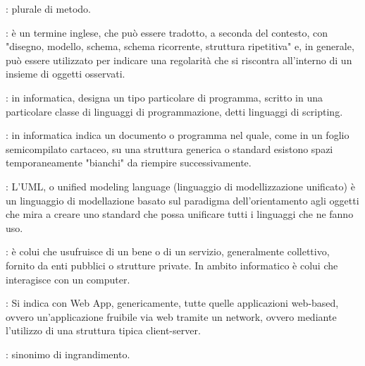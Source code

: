 {		%
		: plurale di metodo.
		

		: è un termine inglese, che può essere tradotto, a seconda del contesto, con "disegno, modello, schema, schema ricorrente, struttura ripetitiva" e, in generale, può essere utilizzato per indicare una regolarità che si riscontra all'interno di un insieme di oggetti osservati.


		: in informatica, designa un tipo particolare di programma, scritto in una particolare classe di linguaggi di programmazione, detti linguaggi di scripting.


		: in informatica indica un documento o programma nel quale, come in un foglio semicompilato cartaceo, su una struttura generica o standard esistono spazi temporaneamente "bianchi" da riempire successivamente.


		: L'UML, o unified modeling language (linguaggio di modellizzazione unificato) è un linguaggio di modellazione basato sul paradigma dell'orientamento agli oggetti
che mira a creare uno standard che possa unificare tutti i linguaggi che ne fanno uso.

		: è colui che usufruisce di un bene o di un servizio, generalmente collettivo, fornito da enti pubblici o strutture private. In ambito informatico è colui che interagisce con un computer.


		: Si indica con Web App, genericamente, tutte quelle applicazioni web-based, ovvero un'applicazione fruibile via web tramite un network, ovvero
mediante l'utilizzo di una struttura tipica client-server.


		: sinonimo di ingrandimento.
	 }
	 
